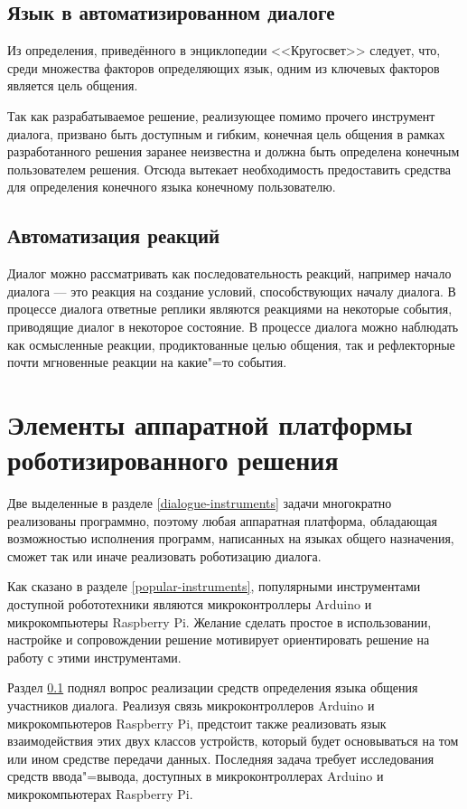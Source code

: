 \subsection{Язык в автоматизированном диалоге}\label{language-auto}
Из определения, приведённого в энциклопедии <<Кругосвет>> \cite{lang-krugosvet} следует, что, среди множества факторов определяющих язык, одним из ключевых факторов является цель общения. 

Так как разрабатываемое решение, реализующее помимо прочего инструмент диалога, призвано быть доступным и гибким, конечная цель общения в рамках разработанного решения заранее неизвестна и должна быть определена конечным пользователем решения. Отсюда вытекает необходимость предоставить средства для определения конечного языка конечному пользователю. 





\subsection{Автоматизация реакций}
Диалог можно рассматривать как последовательность реакций, например начало диалога --- это реакция на создание условий, способствующих началу диалога. В процессе диалога ответные реплики являются реакциями на некоторые события, приводящие диалог в некоторое состояние. В процессе диалога можно наблюдать как осмысленные реакции, продиктованные целью общения, так и рефлекторные почти мгновенные реакции на какие"=то события.



\section{Элементы аппаратной платформы роботизированного решения} \label{apparat-platform}

Две выделенные в разделе \ref{dialogue-instruments} задачи многократно реализованы программно, поэтому любая аппаратная платформа, обладающая возможностью исполнения программ, написанных на языках общего назначения, сможет так или иначе реализовать роботизацию диалога.  

Как сказано в разделе \ref{popular-instruments}, популярными инструментами доступной робототехники являются микроконтроллеры Arduino и микрокомпьютеры Raspberry Pi. Желание сделать простое в использовании, настройке и сопровождении решение мотивирует ориентировать решение на работу с этими инструментами. 


Раздел \ref{language-auto} поднял вопрос реализации средств определения языка общения участников диалога. Реализуя связь микроконтроллеров
Arduino и микрокомпьютеров Raspberry Pi, предстоит также реализовать язык взаимодействия этих двух классов устройств, который будет основываться на том или ином средстве передачи данных. Последняя задача требует исследования средств ввода"=вывода, доступных в микроконтроллерах Arduino и микрокомпьютерах Raspberry Pi.

